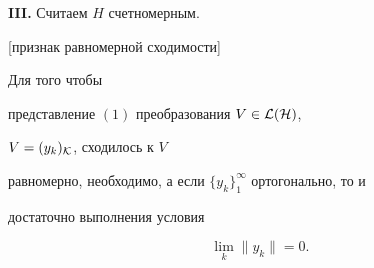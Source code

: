  


 


{\bf III.} Считаем $H$ счетномерным. 


 


\begin{thm}%


[{\selectfont признак равномерной сходимости}] 


Для того чтобы 


представление $(1)$ преобразования $V\in\cal L(H)$, 


$V=(y_k)_{\cal K}$, сходилось к $V$ 


равномерно, необходимо, а если $\{y_k\}^\infty_1$ ортогонально, то и 


достаточно выполнения условия 


\begin{equation} 


\lim_k\|y_k\|=0. 


\end{equation} 


\end{thm}


 


